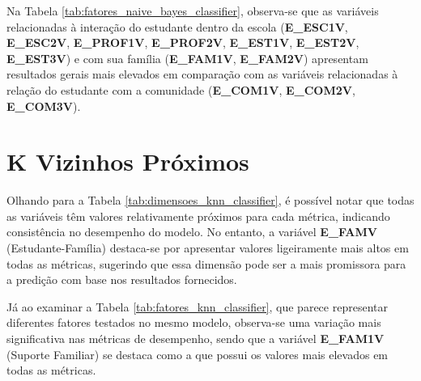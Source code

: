 Na Tabela \ref{tab:fatores_naive_bayes_classifier}, observa-se que as variáveis relacionadas à interação do estudante dentro da escola (\textbf{E\_ESC1V}, \textbf{E\_ESC2V}, \textbf{E\_PROF1V}, \textbf{E\_PROF2V}, \textbf{E\_EST1V}, \textbf{E\_EST2V}, \textbf{E\_EST3V}) e com sua família (\textbf{E\_FAM1V}, \textbf{E\_FAM2V}) apresentam resultados gerais mais elevados em comparação com as variáveis relacionadas à relação do estudante com a comunidade (\textbf{E\_COM1V}, \textbf{E\_COM2V}, \textbf{E\_COM3V}).






\section{K Vizinhos Próximos}

Olhando para a Tabela \ref{tab:dimensoes_knn_classifier}, é possível notar que todas as variáveis têm valores relativamente próximos para cada métrica, indicando consistência no desempenho do modelo. No entanto, a variável \textbf{E\_FAMV} (Estudante-Família) destaca-se por apresentar valores ligeiramente mais altos em todas as métricas, sugerindo que essa dimensão pode ser a mais promissora para a predição com base nos resultados fornecidos.

Já ao examinar a Tabela \ref{tab:fatores_knn_classifier}, que parece representar diferentes fatores testados no mesmo modelo, observa-se uma variação mais significativa nas métricas de desempenho, sendo que a variável \textbf{E\_FAM1V} (Suporte Familiar) se destaca como a que possui os valores mais elevados em todas as métricas.


\begin{table}[ht]
    \centering
    \caption{Dimensões sendo testadas no modelo K Vizinhos Próximos}
    \label{tab:dimensoes_knn_classifier}
\end{table}

